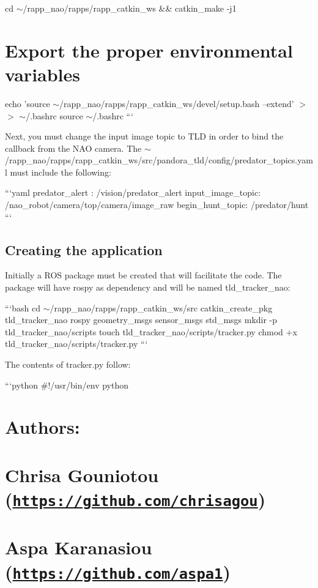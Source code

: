 cd $\sim$/rapp\-\_\-nao/rapps/rapp\-\_\-catkin\-\_\-ws \&\& catkin\-\_\-make -\/j1 \section*{Export the proper environmental variables}

echo 'source $\sim$/rapp\-\_\-nao/rapps/rapp\-\_\-catkin\-\_\-ws/devel/setup.bash --extend' $>$$>$ $\sim$/.bashrc source $\sim$/.bashrc ```

Next, you must change the input image topic to T\-L\-D in order to bind the callback from the N\-A\-O camera. The {\ttfamily $\sim$/rapp\-\_\-nao/rapps/rapp\-\_\-catkin\-\_\-ws/src/pandora\-\_\-tld/config/predator\-\_\-topics.yaml} must include the following\-:

```yaml predator\-\_\-alert \-: /vision/predator\-\_\-alert input\-\_\-image\-\_\-topic\-: /nao\-\_\-robot/camera/top/camera/image\-\_\-raw begin\-\_\-hunt\-\_\-topic\-: /predator/hunt ``` \subsection*{Creating the application}

Initially a R\-O\-S package must be created that will facilitate the code. The package will have {\ttfamily rospy} as dependency and will be named {\ttfamily tld\-\_\-tracker\-\_\-nao}\-:

```bash cd $\sim$/rapp\-\_\-nao/rapps/rapp\-\_\-catkin\-\_\-ws/src catkin\-\_\-create\-\_\-pkg tld\-\_\-tracker\-\_\-nao rospy geometry\-\_\-msgs sensor\-\_\-msgs std\-\_\-msgs mkdir -\/p tld\-\_\-tracker\-\_\-nao/scripts touch tld\-\_\-tracker\-\_\-nao/scripts/tracker.\-py chmod +x tld\-\_\-tracker\-\_\-nao/scripts/tracker.\-py ```

The contents of {\ttfamily tracker.\-py} follow\-:

```python \#!/usr/bin/env python

\section*{Authors\-:}

\section*{Chrisa Gouniotou (\href{https://github.com/chrisagou}{\tt https\-://github.\-com/chrisagou})}

\section*{Aspa Karanasiou (\href{https://github.com/aspa1}{\tt https\-://github.\-com/aspa1})}

